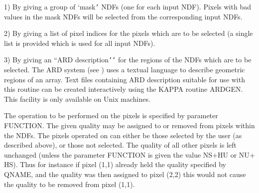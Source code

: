 \documentclass[11pt,nolof,noabs]{starlink}
\begin{document}
\begin{small}
{{      1) By giving a group of `mask\texttt{'} NDFs (one for each input NDF).
      Pixels with bad values in the mask NDFs will be selected from the
      corresponding input NDFs.

      2) By giving a list of pixel indices for the pixels which are to
      be selected (a single list is provided which is used for all input
      NDFs).

      3) By giving an ``ARD description\texttt{'}\texttt{'} for the regions of the NDFs
      which are to be selected. The ARD system (see ) uses a
      textual language to describe geometric regions of an array. Text
      files containing ARD description suitable for use with this
      routine can be created interactively using the KAPPA routine
      ARDGEN. This facility is only available on Unix machines.

      The operation to be performed on the pixels is specified by
      parameter FUNCTION. The given quality may be assigned to or
      removed from pixels within the NDFs. The pixels operated on
      can either be those selected by the user (as described above),
      or those not selected.  The quality of all other pixels is left
      unchanged (unless the parameter FUNCTION is given the value NS$+$HU
      or NU$+$HS). Thus for instance if pixel (1,1) already held the
      quality specified by QNAME, and the quality was then assigned to
      pixel (2,2) this would not cause the quality to be removed from
      pixel (1,1).

}}
\end{small}
\end{document}
